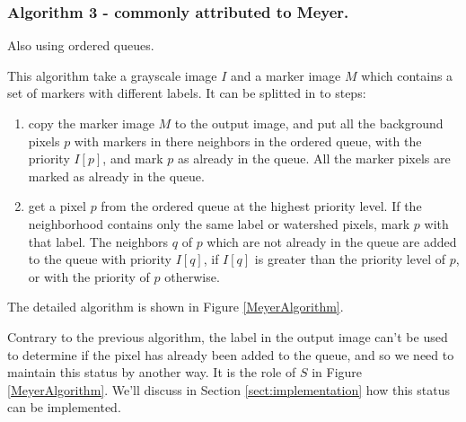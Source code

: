 \documentclass{InsightArticle}
\begin{document}
% 
% 
% 	
% 
% 
% 

\subsubsection{Algorithm 3 - commonly attributed to Meyer.}
\label{sect:MeyerAlgorithm}

Also using ordered queues.

This algorithm take a grayscale image $I$ and a marker image $M$
which contains a set of markers with different labels. It can be
splitted in to steps:
\begin{enumerate}
  \item copy the marker image $M$ to the output image, and put
all the background pixels $p$ with markers in there neighbors in the
ordered queue, with the priority $I[p]$, and mark $p$ as already in
the queue. All the marker pixels are marked as already in the queue.
  \item get a pixel $p$ from the ordered queue at the highest
priority level. If the neighborhood contains only the same label
or watershed pixels, mark $p$ with that label. The neighbors $q$ 
of $p$ which are not already in the queue are added to the queue 
with priority $I[q]$, if $I[q]$ is greater than the priority level
of $p$, or with the priority of $p$ otherwise.
\end{enumerate}

The detailed algorithm is shown in Figure \ref{MeyerAlgorithm}.

Contrary to the previous algorithm, the label in the output image
can't be used to determine if the pixel has already been added to
the queue, and so we need to maintain this status by another way.
It is the role of $S$ in Figure \ref{MeyerAlgorithm}. We'll discuss
in Section \ref{sect:implementation} how this status can be implemented.
\end{document}
